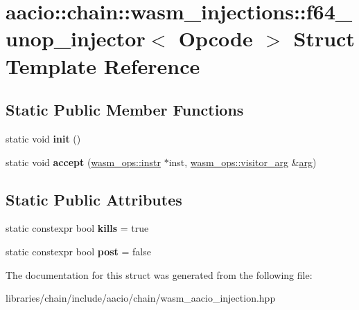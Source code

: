 \hypertarget{structaacio_1_1chain_1_1wasm__injections_1_1f64__unop__injector}{}\section{aacio\+:\+:chain\+:\+:wasm\+\_\+injections\+:\+:f64\+\_\+unop\+\_\+injector$<$ Opcode $>$ Struct Template Reference}
\label{structaacio_1_1chain_1_1wasm__injections_1_1f64__unop__injector}
\subsection*{Static Public Member Functions}
\begin{DoxyCompactItemize}
\item 
\mbox{\label{structaacio_1_1chain_1_1wasm__injections_1_1f64__unop__injector_a38c8d5d49e9ef404524c3687a8a46127}} 
static void {\bfseries init} ()
\item 
\mbox{\label{structaacio_1_1chain_1_1wasm__injections_1_1f64__unop__injector_a6e0714ecbd7fd718177b45e8971f1552}} 
static void {\bfseries accept} (\mbox{\hyperlink{structaacio_1_1chain_1_1wasm__ops_1_1instr}{wasm\+\_\+ops\+::instr}} $\ast$inst, \mbox{\hyperlink{structaacio_1_1chain_1_1wasm__ops_1_1visitor__arg}{wasm\+\_\+ops\+::visitor\+\_\+arg}} \&\mbox{\hyperlink{unionarg}{arg}})
\end{DoxyCompactItemize}
\subsection*{Static Public Attributes}
\begin{DoxyCompactItemize}
\item 
\mbox{\label{structaacio_1_1chain_1_1wasm__injections_1_1f64__unop__injector_a72d8dd5586c30484714d189093fbd469}} 
static constexpr bool {\bfseries kills} = true
\item 
\mbox{\label{structaacio_1_1chain_1_1wasm__injections_1_1f64__unop__injector_a09dbd532495fcfd97ab97afae48d74f8}} 
static constexpr bool {\bfseries post} = false
\end{DoxyCompactItemize}


The documentation for this struct was generated from the following file\+:\begin{DoxyCompactItemize}
\item 
libraries/chain/include/aacio/chain/wasm\+\_\+aacio\+\_\+injection.\+hpp\end{DoxyCompactItemize}
